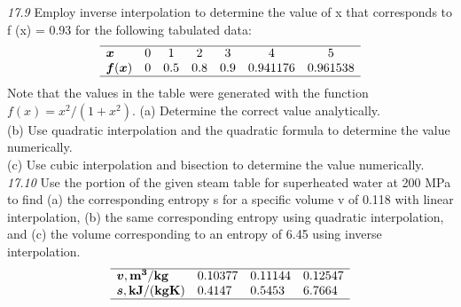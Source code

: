 \documentclass[../main.tex]{subfiles}
\begin{document}
\begin{multicols}{2}
\noindent\textit{17.9} Employ inverse interpolation to determine the value of
x that corresponds to f (x) = 0.93 for the following tabulated data:
$$
\begin{array}{lccccccc}
    \hline \boldsymbol{x} & 0 & 1 & 2 & 3 & 4 & 5 \\
    \boldsymbol{f}(\boldsymbol{x}) & 0 & 0.5 & 0.8 & 0.9 & 0.941176 & 0.961538 \\
    \hline
\end{array}
$$
    Note that the values in the table were generated with the function $f(x)=x^{2} /\left(1+x^{2}\right)$.
    (a) Determine the correct value analytically.\\
    (b) Use quadratic interpolation and the quadratic formula to
    determine the value numerically.\\
    (c) Use cubic interpolation and bisection to determine the
    value numerically.\\
    \noindent\textit{17.10} Use the portion of the given steam table for superheated water at 200 MPa to find (a) the corresponding
    entropy s for a specific volume v of 0.118 with linear interpolation, (b) the same corresponding entropy using quadratic interpolation, and (c) the volume corresponding to an
    entropy of 6.45 using inverse interpolation.
    $$
    \begin{array}{llll}
    \hline \boldsymbol{v}, \mathbf{m}^{\mathbf{3}} / \mathbf{k g} & 0.10377 & 0.11144 & 0.12547 \\
    \boldsymbol{s}, \mathbf{k} \mathbf{J} /(\mathbf{k g} \mathbf{K}) & 0.4147 & 0.5453 & 6.7664 \\
    \hline
    \end{array}
    $$


\end{multicols}
\end{document}
